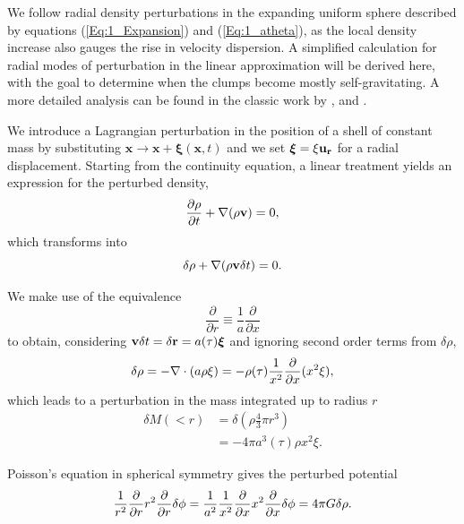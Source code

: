 We follow radial density perturbations in the expanding uniform sphere described by equations (\ref{Eq:1_Expansion}) and (\ref{Eq:1_atheta}), as the local density increase also gauges the rise in velocity dispersion. A simplified calculation for radial modes of perturbation in the linear approximation will be derived here, with the goal to determine when the clumps become mostly self-gravitating. A more detailed analysis can be found in the classic work by \cite{Friedman1978}, \cite{Peebles1980} and \cite{Aarseth1988} .

We introduce a Lagrangian perturbation in the position of a shell of constant mass by substituting $\mathbf{x} \rightarrow \mathbf{x} + \boldsymbol\xi(\mathbf{x},t)$ and we set $\boldsymbol\xi = \xi \bold{u_r}$ for a radial displacement. Starting from the continuity equation, a linear treatment yields an expression for the perturbed density,
\begin{equation}
\frac{\partial \rho}{\partial t} + \nabla(\rho \bold{v}) = 0, 
\end{equation}
which transforms into
\begin{equation}
\delta \rho + \nabla (\rho \bold{v} \delta t) = 0.
\end{equation}

We make use of the equivalence
\begin{equation}
\label{Eq:1_derivequiv}
\frac{\partial}{\partial r} \equiv \frac{1}{a} \frac{\partial}{\partial x}
\end{equation}
to obtain, considering $ \bold{v} \delta t = \delta \bold{r} = a(\tau) \boldsymbol\xi$ and ignoring second order terms from $\delta \rho$,
\begin{equation} 
\label{Eq:1_DeltaRho} 
\delta\rho = - \mathbf{\nabla}\cdot (a\rho\mathbf{\xi}) =  - \rho(\tau) \frac{1}{x^2}\frac{\partial}{\partial x} ( x^2\xi ),
\end{equation}
which leads to a perturbation in  the mass integrated up to radius $r$ 
\begin{align}
\delta M(<r) &= \delta \left( \rho \frac{4}{3} \pi r^3 \right)\\
    &= - 4\pi a^3(\tau) \rho x^2 \xi . 
\end{align}


Poisson's equation in spherical symmetry gives the perturbed potential 
\begin{equation} 
\label{Eq:1_Poisson} 
\frac{1}{r^2}\frac{\partial}{\partial r} r^2\frac{\partial}{\partial r} \delta\phi =\frac{1}{a^2}\frac{1}{x^2}\frac{\partial}{\partial x} x^2\frac{\partial}{\partial x} \delta\phi  = 4\pi G\delta\rho .
\end{equation}


